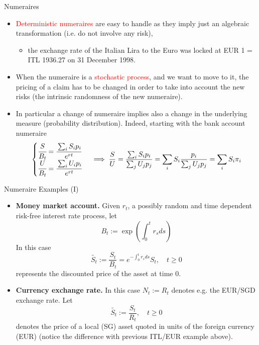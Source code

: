\documentclass{beamer}
\begin{document}
\begin{frame}{Numeraires}
  \begin{itemize}
  \item<1-> \textcolor{red}{Deterministic numeraires} are easy to handle as they imply just an algebraic transformation (i.e. do not involve any risk),
    \begin{itemize}
    \item the exchange rate of the Italian Lira to the Euro was locked at EUR 1 = ITL 1936.27 on 31 December 1998.
    \end{itemize}
  \item<2-> When the numeraire is a \textcolor{red}{stochastic process}, and we want to move to it, the pricing of a claim has to be changed in order to take into account the new risks (the intrinsic randomness of the new numeraire).
  \item<3-> In particular a change of numeraire implies also a change in the underlying measure (probability distribution). Indeed, starting with the bank account numeraire
    \begin{equation*}
      \begin{cases}
        \cfrac{S}{B_t} = \cfrac{\sum_i S_i p_i}{e^{rt}}\\
        \cfrac{U}{B_t} = \cfrac{\sum_i U_i p_i}{e^{rt}}
      \end{cases}\implies
      \frac{S}{U} = \frac{\sum_i S_i p_i}{\sum_j U_j p_j} = \sum_i S_i \frac{p_i}{\sum_j U_j p_j} = \sum_i S_i \pi_i
    \end{equation*}
  \end{itemize}
\end{frame}

\begin{frame}{Numeraire Examples (I)}
  \begin{itemize}
  \item<1-> \textbf{Money market account.} Given $r_t$, a possibly random and time dependent risk-free interest rate process, let
    \begin{equation*}
      B_t := \exp\left(\int_0^t r_s ds\right)
    \end{equation*}
    In this case 
    \begin{equation*}
      \tilde{S_t}:=\frac{S_t}{B_t}=e^{-\int_0^t r_s ds}S_t, \quad t \ge 0
    \end{equation*}
    represents the discounted price of the asset at time 0.
  \item<2-> \textbf{Currency exchange rate.} In this case $N_t := R_t$ denotes e.g. the EUR/SGD exchange rate. Let
    \begin{equation*}
      \tilde{S_t}:=\frac{S_t}{R_t}, \quad t \ge 0
    \end{equation*}
    denotes the price of a local (SG) asset quoted in units of the foreign currency (EUR) (notice the difference with previous ITL/EUR example above).
  \end{itemize}
\end{frame}
\end{document}
